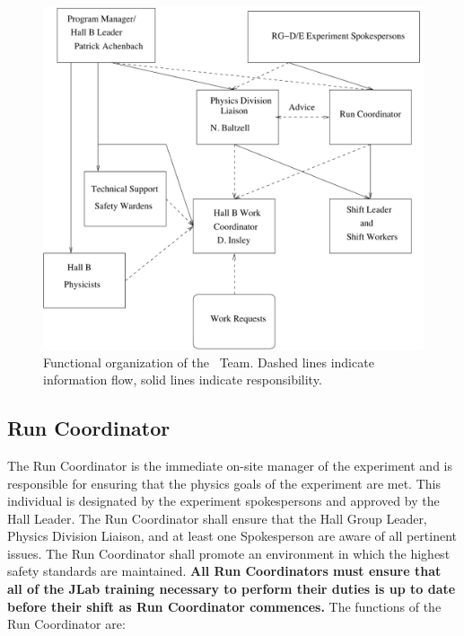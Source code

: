 \documentclass[11pt]{article}
\begin{document}
\begin{figure}
\includegraphics[width=\textwidth]{coo_HallB_CLAS12_rgDEorg.pdf}
\caption[Dummy caption.]{Functional organization of the \HALL\ Team. Dashed
lines indicate information flow, solid lines indicate responsibility.}
\label{HALLCHART} 
\end{figure}


\subsection{Run Coordinator}
\indent

The Run Coordinator is the  immediate on-site manager of the experiment 
and is responsible for ensuring that the physics goals of the experiment 
are met. This individual is designated by the experiment spokespersons 
and approved by the Hall Leader.  The Run Coordinator shall ensure that 
the Hall Group Leader, Physics Division Liaison, and at least 
one Spokesperson are aware of all pertinent issues. The Run Coordinator
shall promote an environment in which the highest safety
standards are maintained.
{\bf All Run Coordinators must ensure that all of the JLab training necessary to perform 
their duties is up to date before their shift as Run Coordinator commences.}
The functions of the Run Coordinator  are: 
\end{document}
